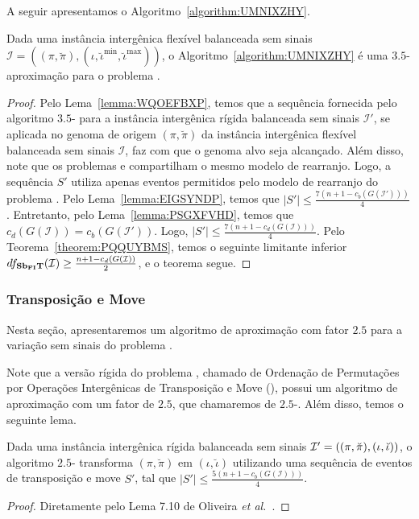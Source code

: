 A seguir apresentamos o Algoritmo~\ref{algorithm:UMNIXZHY}.



\begin{theorem}\label{theorem:PSELGHNY}
Dada uma instância intergênica flexível balanceada sem sinais $\mathcal{I} = ((\pi,\breve\pi),(\iota,\breve\iota^{\min},\breve\iota^{\max}))$, o Algoritmo~\ref{algorithm:UMNIXZHY} é uma $3.5$-aproximação para o problema \SbFIT{}.
\end{theorem}
\begin{proof}
Pelo Lema~\ref{lemma:WQOEFBXP}, temos que a sequência fornecida pelo algoritmo $3.5$-\SbIT{} para a instância intergênica rígida balanceada sem sinais $\mathcal{I'}$, se aplicada no genoma de origem $(\pi,\breve\pi)$ da instância intergênica flexível balanceada sem sinais $\mathcal{I}$, faz com que o genoma alvo seja alcançado. Além disso, note que os problemas \SbIT{} e \SbFIT{} compartilham o mesmo modelo de rearranjo. Logo, a sequência $S'$ utiliza apenas eventos permitidos pelo modelo de rearranjo do problema \SbFIT{}. Pelo Lema~\ref{lemma:EIGSYNDP}, temos que $|S'| \le \frac{7({n+1} - c_b(G(\mathcal{I}')))}{4}$. Entretanto, pelo Lema~\ref{lemma:PSGXFVHD}, temos que $c_d(G(\mathcal{I})) = c_b(G(\mathcal{I}'))$. Logo, $|S'| \le \frac{7({n+1} - c_d(G(\mathcal{I})))}{4}$. Pelo Teorema~\ref{theorem:PQQUYBMS}, temos o seguinte limitante inferior $df_{\textbf{Sb\textsubscript{FI}T}}(\mathcal{I}) \ge \frac{{n+1} - c_d(G(\mathcal{I}))}{2}$, e o teorema segue.
\end{proof}

\subsubsection{Transposição e Move}

Nesta seção, apresentaremos um algoritmo de aproximação com fator $2.5$ para a variação sem sinais do problema \SbFITM{}. 

Note que a versão rígida do problema \SbFITM{}, chamado de Ordenação de Permutações por Operações Intergênicas de Transposição e Move (\SbITM), possui um algoritmo de aproximação com um fator de $2.5$, que chamaremos de $2.5$-\SbITM{}. Além disso, temos o seguinte lema.

\begin{lemma}\label{lemma:PDDYJXYT}
Dada uma instância intergênica rígida balanceada sem sinais $\mathcal{I}'=((\pi,\breve\pi),\break(\iota,\breve\iota))$, o algoritmo $2.5$-\SbITM{} transforma $(\pi,\breve\pi)$ em $(\iota,\breve\iota)$ utilizando uma sequência de eventos de transposição e move $S'$, tal que $|S'| \le \frac{5({n+1} - c_b(G(\mathcal{I})))}{4}$.
\end{lemma}
\begin{proof}
Diretamente pelo Lema 7.10 de Oliveira \textit{et al.}~\cite{2021a-oliveira-etal}.
\end{proof}

